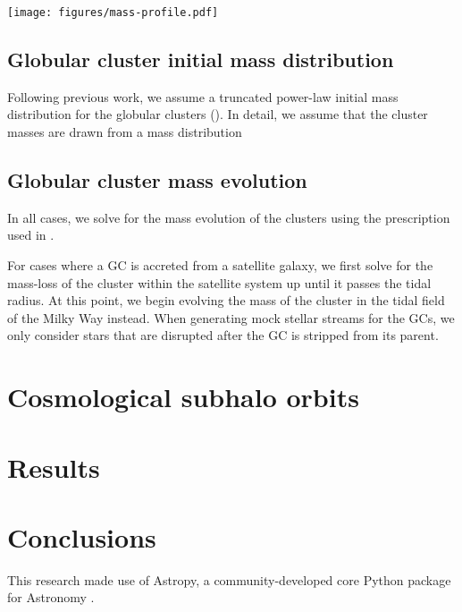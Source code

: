 \documentclass[manuscript, letterpaper]{aastex6}
\begin{document}
\begin{figure*}[p]
\begin{center}
\texttt{[image: figures/mass-profile.pdf]}
\end{center}
\caption{%
\label{fig:mass-profile}}
\end{figure*}

\subsection{Globular cluster initial mass distribution} \label{sec:gcmassdist}

Following previous work, we assume a truncated power-law initial mass
distribution for the globular clusters (\citealt{Gnedin:2014}).
In detail, we assume that the cluster masses are drawn from a mass distribution


\subsection{Globular cluster mass evolution} \label{sec:gcmassevolution}

In all cases, we solve for the mass evolution of the clusters using the
prescription used in \citet{Gnedin:2014}.

For cases where a GC is accreted from a satellite galaxy, we first solve for
the mass-loss of the cluster within the satellite system up until it passes the
tidal radius.
At this point, we begin evolving the mass of the cluster in the tidal field of
the Milky Way instead.
When generating mock stellar streams for the GCs, we only consider stars that
are disrupted after the GC is stripped from its parent.

\section{Cosmological subhalo orbits} \label{sec:aqorbits}

\section{Results}

\subsection{}

\section{Conclusions}\label{sec:conclusions}

\acknowledgements
This research made use of
Astropy, a community-developed core Python package for Astronomy
\citep{Astropy-Collaboration:2013}.



\end{document}
